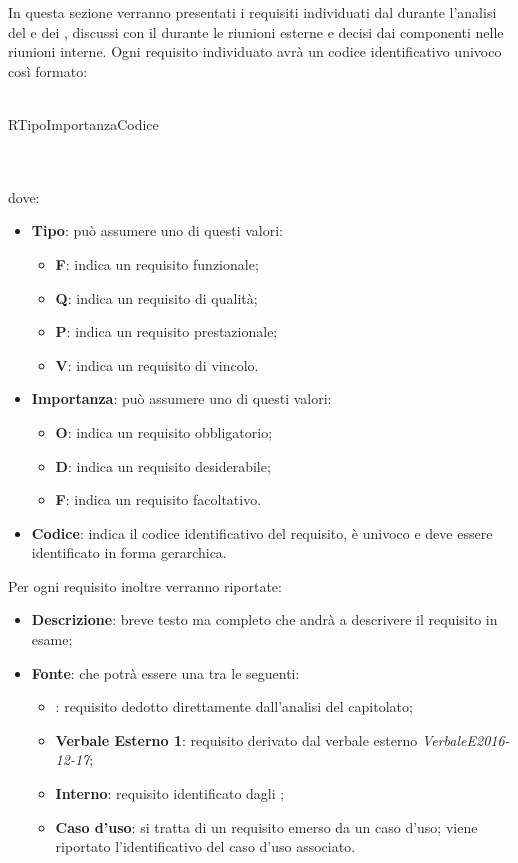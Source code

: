 \documentclass[AdR.tex]{subfiles}
\begin{document}
In questa sezione verranno presentati i requisiti individuati dal  durante l'analisi del 
e dei , discussi con il  durante le riunioni esterne e decisi dai componenti
nelle riunioni interne.
Ogni requisito individuato avrà un codice identificativo univoco così formato: \\ \\
\centerline{R\textbraceleft{}Tipo\textbraceright{}\textbraceleft{}Importanza\textbraceright{}\textbraceleft{}Codice\textbraceright{}}
 \\ \\
dove:
\begin{itemize}
 	\item \textbf{Tipo}: può assumere uno di questi valori:
 	\begin{itemize}
 		\item \textbf{F}: indica un requisito funzionale;
 		\item \textbf{Q}: indica un requisito di qualità;
 		\item \textbf{P}: indica un requisito prestazionale;
 		\item \textbf{V}: indica un requisito di vincolo.
 	\end{itemize}
 	\item \textbf{Importanza}: può assumere uno di questi valori:
 	\begin{itemize}
 		\item \textbf{O}: indica un requisito obbligatorio;
 		\item \textbf{D}: indica un requisito desiderabile;
 		\item \textbf{F}: indica un requisito facoltativo.
 	\end{itemize}
 	\item \textbf{Codice}: indica il codice identificativo del requisito, è univoco e deve essere identificato in forma gerarchica.
 \end{itemize}
Per ogni requisito inoltre verranno riportate:
\begin{itemize}
	\item \textbf{Descrizione}: breve testo ma completo che andrà a descrivere il requisito in esame;
	\item \textbf{Fonte}: che potrà essere una tra le seguenti:
	\begin{itemize}
		\item \textbf{}: requisito dedotto direttamente dall'analisi del capitolato;
		\item \textbf{Verbale Esterno 1}: requisito derivato dal verbale esterno \textit{Verbale\textunderscore{}E\textunderscore{}2016-12-17};
		\item \textbf{Interno}: requisito identificato dagli \ANP;
		\item \textbf{Caso d'uso}: si tratta di un requisito emerso da un caso d'uso; viene riportato l'identificativo del caso d'uso associato.
	\end{itemize}
\end{itemize}
\end{document}
